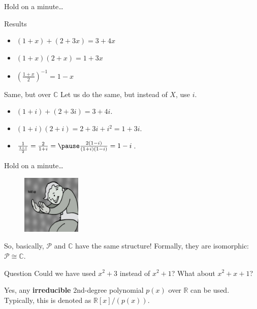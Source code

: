 \documentclass{beamer}
\begin{document}
    \begin{frame}{Hold on a minute\ldots}
        \begin{block}{Results}
            \begin{itemize}
                \item $(1+x)+(2+3x)=3+4x$
                \item $(1+x)(2+x)=1+3x$
                \item $\left(\frac{1+x}{2}\right)^{-1} = 1-x$
            \end{itemize}
        \end{block}
        
        \begin{block}{Same, but over $\mathbb{C}$}
            Let us do the same, but instead of $X$, use $i$.\pause
            \begin{itemize}
                \item $(1+i)+(2+3i)=3+4i$.\pause
                \item $(1+i)(2+i)=2+3i+i^2=1+3i$.\pause
                \item $\frac{1}{\frac{1+i}{2}} = \frac{2}{1+i} = \pause\frac{2(1-i)}{(1+i)(1-i)} = 1-i$.
            \end{itemize}
        \end{block}
    \end{frame}

    \begin{frame}{Hold on a minute\dots}
        \begin{figure}
            \centering
            \includegraphics[width=0.25\textwidth]{images/lecture_3/hold_up.jpg}
        \end{figure}

        So, basically, $\mathcal{P}$ and $\mathbb{C}$ have the same structure! Formally, they are isomorphic: $\mathcal{P} \cong \mathbb{C}$.\pause

        \begin{alertblock}{Question}
            Could we have used $x^2+3$ instead of $x^2+1$? What about $x^2+x+1$?\pause
        \end{alertblock}

        Yes, any \textbf{irreducible} 2nd-degree polynomial $p(x)$ over $\mathbb{R}$ can be used. Typically, this is denoted as $\boxed{\mathbb{R}[x]/(p(x))}$.
    \end{frame}
\end{document}
